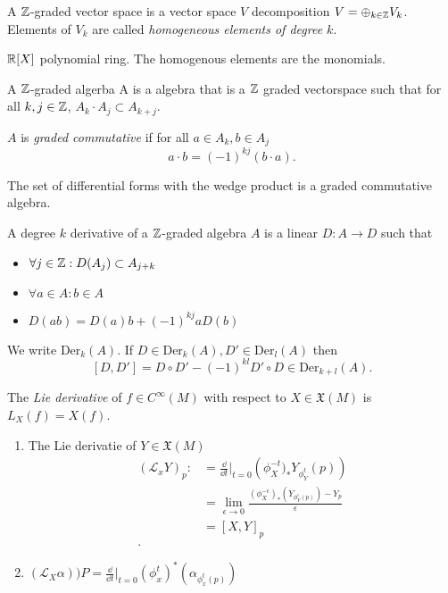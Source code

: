 \begin{definition}
A $\mathbb{Z}$-graded vector space is a vector space $V$ decomposition $V  = \oplus_{k \in \mathbb{Z}}V_k$. 	
Elements of $V_k$ are called \emph{homogeneous elements of degree  $k$}.
\end{definition}
\begin{example}
	$\mathbb{R}[X]$ polynomial ring. The homogenous elements are the monomials. 
\end{example}
\begin{definition}
A $\mathbb{Z}$-graded algerba A is a  algebra that is a $\mathbb{Z}$ graded vectorspace such that for all $k, j \in \mathbb{Z}$, $A_k \cdot A_j \subset A_{k+ j}$.

$A$ is \emph{graded commutative} if for all  $a \in A_k, b \in A_j$  \[
	a\cdot b = (-1)^{kj}(b\cdot a)
.\] 
\end{definition}
\begin{example}
	The set of differential forms with the wedge product is a graded commutative algebra.
\end{example}
\begin{definition}
	A degree $k$ derivative of a $\mathbb{Z}$-graded algebra $A$ is a linear $D: A \to D$ such that
	\begin{itemize}
		\item $\forall j  \in  \mathbb{Z}: D(A_j) \subset  A_{j+k}$ 
		\item $\forall a \in A: b \in A$ 
	\item $D(ab) = D(a) b + (-1)^{kj}a D(b)$
	\end{itemize}
	We write $\text{Der}_k(A)$. 
	If $D \in \text{Der}_k(A) , D' \in \text{Der}_l(A)$ then \[
		[D, D'] = D\circ D' - (-1)^{kl}D'\circ D \in \text{Der}_{k + l}(A) 
	.\] 

\end{definition}
\begin{definition}
	The  \emph{Lie derivative} of $f \in C^{\infty}(M)$ with respect to $X \in \mathfrak{X} (M)$ is $L_X(f)= X(f)$.  
	\begin{enumerate}
		\item The Lie derivatie of $Y \in \mathfrak{X} (M)$ \begin{align*}
				(\mathcal{L} _x Y)_p :&= \frac{\dd}{\dd t}|_{t = 0}\left( \phi_X^{-t})_* Y _{\phi^{t}_Y}(p) \right) \\
						      &= \lim_{\epsilon \to 0} \frac{(\phi_X^{-\epsilon})_*(Y_{\phi_Y^{\epsilon}(p)}) - Y_p}{\epsilon} \\ 
						      &= [X,Y]_p \\
			.\end{align*} 
		\item $(\mathcal{L}_X \alpha))P = \frac{\dd}{\dd t} | _{t = 0} (\phi^{t}_x)^*(\alpha_{\phi^{t}_x (p)}) $
	\end{enumerate}

\end{definition}
